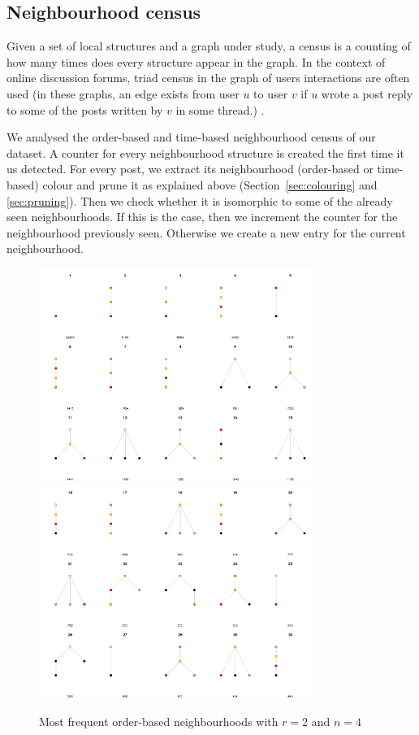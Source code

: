 \documentclass[conference]{IEEEtran}
\begin{document}
\subsection{Neighbourhood census}
Given a set of local structures and a graph under study, a census is a counting of how many times does every structure appear in the graph. In the context of online discussion forums, triad census in the graph of users interactions are often used (in these graphs, an edge exists from user $u$ to user $v$ if $u$ wrote a post reply to some of the posts written by $v$ in some thread.) \cite{Adamic2008, Lumbreras2013}.

We analysed the order-based and time-based neighbourhood census of our dataset. A counter for every neighbourhood structure is created the first time it us detected. For every post, we extract its neighbourhood (order-based or time-based) colour and prune it as explained above (Section~\ref{sec:colouring} and \ref{sec:pruning}). Then we check whether it is isomorphic to some of the already seen neighbourhoods. If this is the case, then we increment the counter for the neighbourhood previously seen. Otherwise we create a new entry for the current neighbourhood.
\begin{figure}
	\centering
	\includegraphics[width=0.8\textwidth]{census_orderbased_1}
	\includegraphics[width=0.8\textwidth]{census_orderbased_2}
	\caption{Most frequent order-based neighbourhoods with $r=2$ and $n=4$}
	\label{fig:census_orderbased}
\end{figure}
\end{document}
